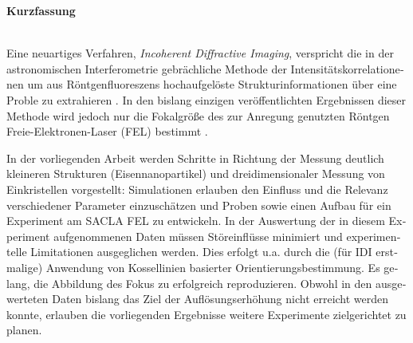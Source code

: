  \begin{otherlanguage}{german}
 \begin{Huge}
 	\textbf{Kurzfassung}\vspace{12mm}
 \end{Huge}
\\
Eine neuartiges Verfahren, \textit{Incoherent Diffractive Imaging}, verspricht die in der astronomischen Interferometrie gebrächliche Methode der Intensitätskorrelationenen um aus Röntgenfluoreszens hochaufgelöste Strukturinformationen über eine Proble zu extrahieren \cite{classen2017}.  
In den bislang einzigen veröffentlichten Ergebnissen dieser Methode wird jedoch nur  die Fokalgröße des zur Anregung genutzten Röntgen Freie-Elektronen-Laser (FEL) bestimmt \cite{nakumura2020}.

In der vorliegenden Arbeit werden Schritte in Richtung der Messung deutlich kleineren Strukturen (Eisennanopartikel) und dreidimensionaler Messung von Einkristellen vorgestellt: Simulationen erlauben den Einfluss und die Relevanz verschiedener Parameter einzuschätzen und Proben sowie einen Aufbau für ein Experiment am SACLA FEL zu entwickeln. In der Auswertung der in diesem Experiment aufgenommenen Daten müssen Störeinflüsse minimiert und experimentelle Limitationen ausgeglichen werden. Dies erfolgt u.a. durch die (für IDI erstmalige) Anwendung von Kossellinien basierter Orientierungsbestimmung.  
Es gelang, die Abbildung des Fokus zu erfolgreich reproduzieren.  Obwohl in den ausgewerteten Daten bislang das Ziel der Auflösungserhöhung nicht erreicht werden konnte, erlauben die vorliegenden Ergebnisse weitere Experimente zielgerichtet zu planen.
\end{otherlanguage}